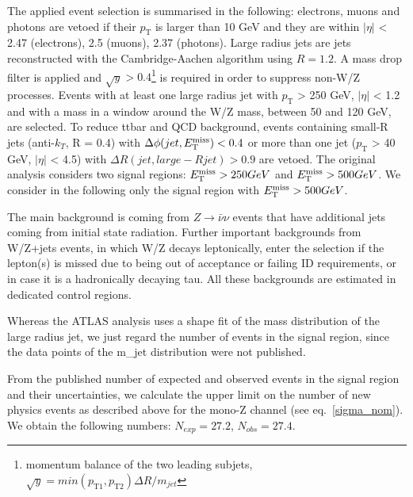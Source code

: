 The applied event selection is summarised in the following: electrons, muons and photons are vetoed if their $p_{\mathrm{T}}$ is larger than 10 GeV and they are within $|\eta|$ < 2.47 (electrons), 2.5 (muons), 2.37 (photons). 
Large radius jets are jets reconstructed with the Cambridge-Aachen algorithm using $R = 1.2$. A mass drop filter is applied and $\sqrt{y}>0.4$\footnote{momentum balance of the two leading subjets, $\sqrt{y} = min(p_{\mathrm{T}1},p_{\mathrm{T}2})\Delta R / m_{jet}$} is required in order to suppress non-W/Z processes.
Events with at least one large radius jet with $p_{\mathrm{T}}$ > 250 GeV, $|\eta|$ < 1.2 and with a mass in a window around the W/Z mass, between 50 and 120 GeV, are selected.
To reduce ttbar and QCD background, events containing small-R jets (anti-$k_T$, R = 0.4) with $\Delta\phi(jet,E_{\mathrm{T}}^{\mathrm{miss}})< 0.4$ or more than one jet ($p_{\mathrm{T}}$ > 40 GeV, $|\eta|$ < 4.5) with $\Delta R(jet,large-R jet)>0.9$ are vetoed. The original analysis considers two signal regions: $E_{\mathrm{T}}^{\mathrm{miss}} > 250 GeV$ and $E_{\mathrm{T}}^{\mathrm{miss}} > 500 GeV$. We consider in the following only the signal region with $E_{\mathrm{T}}^{\mathrm{miss}} > 500 GeV$.

The main background is coming from $Z \rightarrow \bar{\nu} \nu$ events that have additional jets coming from initial state radiation. Further important backgrounds from W/Z+jets events, in which W/Z decays leptonically, enter the selection if the lepton(s) is missed due to being out of acceptance or failing ID requirements, or in case it is a hadronically decaying tau. All these backgrounds are estimated in dedicated control regions.

Whereas the ATLAS analysis uses a shape fit of the mass distribution of the large radius jet, we just regard the number of events in the signal region, since the data points of the m_jet distribution were not published. 

From the published number of expected and observed events in the signal region and their uncertainties, we calculate the upper limit on the number of new physics events as described above for the mono-Z channel (see eq.~\ref{sigma_nom}). We obtain the following numbers:  $N_{exp} = 27.2$, $N_{obs} = 27.4$. 

\iffalse


\textcolor{magenta}{This section should include:}
\begin{enumerate}
\item \textcolor{magenta}{A description of the general process employed to reinterpret monojet, mono-W and mono-Z limits. This should cover MC signal generation, the cuts used in each mono-X channel and validation of the procedure(s) used to generate the results.}
\item \textcolor{magenta}{Monojet specifics: motivation for why the SUSY results were used instead of the monojet+MET results.}
\item \textcolor{magenta}{A description of the assessment of the systematics.}
\item \textcolor{magenta}{The limit setting strategy (?).}
\end{enumerate}

\fi

